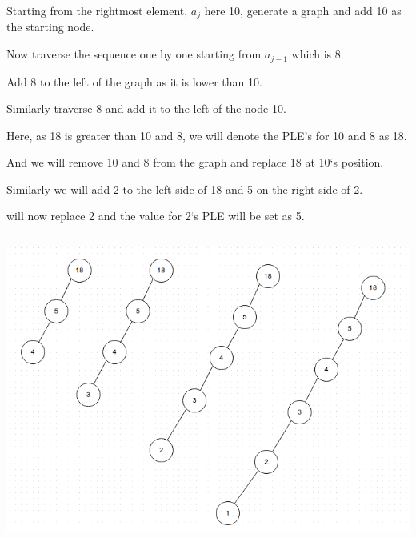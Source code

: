 \documentclass[letterpaper,portrait,12pt]{article}
\begin{document}
\begin{flushleft}
Starting from the rightmost element, $a_j$ here 10, generate a graph and add 10 as the starting node.
\end{flushleft}


\begin{flushleft}

\end{flushleft}


\begin{flushleft}
	Now traverse the sequence one by one starting from $a_{j-1}$ which is 8.
\end{flushleft}


\begin{flushleft}
	Add 8 to the left of the graph as it is lower than 10.
\end{flushleft}


\begin{flushleft}
	Similarly traverse 8 and add it to the left of the node 10.
\end{flushleft}


\begin{flushleft}
	Here, as 18 is greater than 10 and 8, we will denote the PLE's for 10 and 8 as 18. 
\end{flushleft}


\begin{flushleft}
	And we will remove 10 and 8 from the graph and replace 18 at 10{`}s position.
\end{flushleft}


\begin{flushleft}
	Similarly we will add 2 to the left side of 18 and 5 on the right side of 2.
\end{flushleft}


\begin{flushleft}
	will now replace 2 and the value for 2{`}s PLE will be set as 5.
\end{flushleft}


\begin{flushleft}
\includegraphics[height=4.0056in,width=6.5125in]{0b338ae4-1aad-11e3-96b1-99a1a326a3b2.png}

\end{flushleft}
\end{document}
